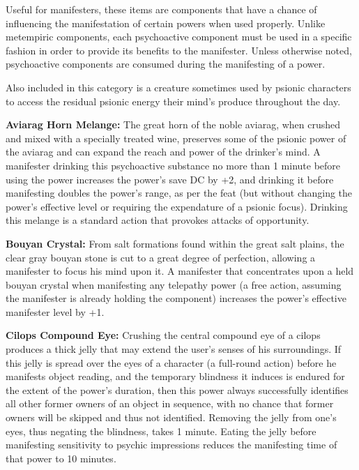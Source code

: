 Useful for manifesters, these items are components that have a chance of influencing the manifestation of certain powers when used properly. Unlike metempiric components, each psychoactive component must be used in a specific fashion in order to provide its benefits to the manifester. Unless otherwise noted, psychoactive components are consumed during the manifesting of a power.

Also included in this category is a creature sometimes used by psionic characters to access the residual psionic energy their mind's produce throughout the day.


\textbf{Aviarag Horn Melange:} The great horn of the noble aviarag, when crushed and mixed with a specially treated wine, preserves some of the psionic power of the aviarag and can expand the reach and power of the drinker's mind. A manifester drinking this psychoactive substance no more than 1 minute before using the  power increases the power's save DC by +2, and drinking it before manifesting  doubles the power's range, as per the  feat (but without changing the power's effective level or requiring the expendature of a psionic focus). Drinking this melange is a standard action that provokes attacks of opportunity.

\textbf{Bouyan Crystal:} From salt formations found within the great salt plains, the clear gray bouyan stone is cut to a great degree of perfection, allowing a manifester to focus his mind upon it. A manifester that concentrates upon a held bouyan crystal when manifesting any telepathy power (a free action, assuming the manifester is already holding the component) increases the power's effective manifester level by +1.

\textbf{Cilops Compound Eye:} Crushing the central compound eye of a cilops produces a thick jelly that may extend the user's senses of his surroundings. If this jelly is spread over the eyes of a character (a full-round action) before he manifests object reading, and the temporary blindness it induces is endured for the extent of the power's duration, then this power always successfully identifies all other former owners of an object in sequence, with no chance that former owners will be skipped and thus not identified. Removing the jelly from one's eyes, thus negating the blindness, takes 1 minute. Eating the jelly before manifesting sensitivity to psychic impressions reduces the manifesting time of that power to 10 minutes.

